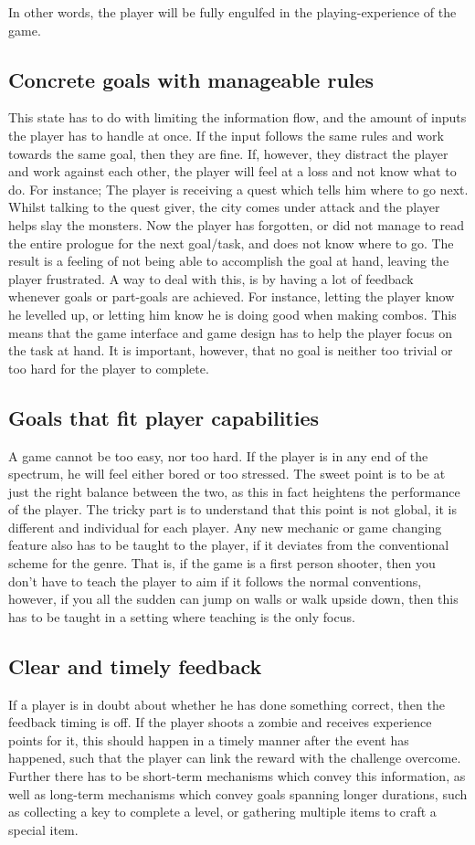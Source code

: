 In other words, the player will be fully engulfed in the playing-experience of the game.

\subsection{Concrete goals with manageable rules}
This state has to do with limiting the information flow, and the amount of inputs the player has to handle at once. If
the input follows the same rules and work towards the same goal, then they are fine. If, however, they distract the
player and work against each other, the player will feel at a loss and not know what to do. For instance; The player is
receiving a quest which tells him where to go next. Whilst talking to the quest giver, the city comes under attack and
the player helps slay the monsters. Now the player has forgotten, or did not manage to read the entire prologue for the
next goal/task, and does not know where to go. The result is a feeling of not being able to accomplish the goal at
hand, leaving the player frustrated.  A way to deal with this, is by having a lot of feedback whenever goals or
part-goals are achieved. For instance, letting the player know he levelled up, or letting him know he is doing good
when making combos. This means that the game interface and game design has to help the player focus on the task at
hand. It is important, however, that no goal is neither too trivial or too hard for the player to complete.

\subsection{Goals that fit player capabilities}
A game cannot be too easy, nor too hard. If the player is in any end of the spectrum, he will feel either bored or too
stressed. The sweet point is to be at just the right balance between the two, as this in fact heightens the performance
of the player. The tricky part is to understand that this point is not global, it is different and individual for each
player. Any new mechanic or game changing feature also has to be taught to the player, if it deviates from the
conventional scheme for the genre. That is, if the game is a first person shooter, then you don't have to teach the
player to aim if it follows the normal conventions, however, if you all the sudden can jump on walls or walk upside
down, then this has to be taught in a setting where teaching is the only focus.

\subsection{Clear and timely feedback}
If a player is in doubt about whether he has done something correct, then the feedback timing is off. If the player
shoots a zombie and receives experience points for it, this should happen in a timely manner after the event has
happened, such that the player can link the reward with the challenge overcome. Further there has to be short-term
mechanisms which convey this information, as well as long-term mechanisms which convey goals spanning longer durations,
such as collecting a key to complete a level, or gathering multiple items to craft a special item.

